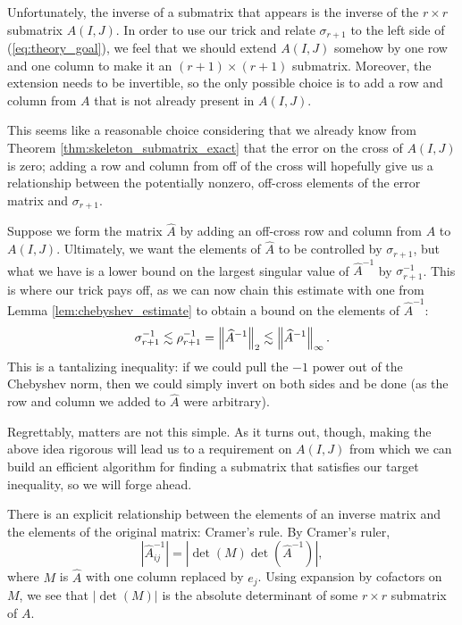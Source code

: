 \documentclass{article}
\begin{document}
	Unfortunately, the inverse of a submatrix that appears is the inverse of the $r\times r$ submatrix $A(I,J)$. In order to use our trick and relate $\sigma_{r+1}$ to the left side of (\ref{eq:theory_goal}), we feel that we should extend $A(I,J)$ somehow by one row and one column to make it an $(r+1)\times(r+1)$ submatrix. Moreover, the extension needs to be invertible, so the only possible choice is to add a row and column from $A$ that is not already present in $A(I,J)$.
	
	This seems like a reasonable choice considering that we already know from Theorem \ref{thm:skeleton_submatrix_exact} that the error on the cross of $A(I,J)$ is zero; adding a row and column from off of the cross will hopefully give us a relationship between the potentially nonzero, off-cross elements of the error matrix and $\sigma_{r+1}$.
	
	Suppose we form the matrix $\widehat{A}$ by adding an off-cross row and column from $A$ to $A(I,J)$. Ultimately, we want the elements of $\widehat{A}$ to be controlled by $\sigma_{r+1}$, but what we have is a lower bound on the largest singular value of $\widehat{A}^{-1}$ by $\sigma_{r+1}^{-1}$. This is where our trick pays off, as we can now chain this estimate with one from Lemma \ref{lem:chebyshev_estimate} to obtain a bound on the elements of $\widehat{A}^{-1}$:
	\begin{equation}
		\label{eq:almost_there}
		\sigma_{r+1}^{-1} \lesssim \rho_{r+1}^{-1} = \left\lVert \widehat{A}^{-1} \right\rVert_2 \lesssim \left\lVert \widehat{A}^{-1} \right\rVert_\infty.
	\end{equation}
	This is a tantalizing inequality: if we could pull the $-1$ power out of the Chebyshev norm, then we could simply invert on both sides and be done (as the row and column we added to $\widehat{A}$ were arbitrary).
	
	Regrettably, matters are not this simple. As it turns out, though, making the above idea rigorous will lead us to a requirement on $A(I,J)$ from which we can build an efficient algorithm for finding a submatrix that satisfies our target inequality, so we will forge ahead.
	
	There is an explicit relationship between the elements of an inverse matrix and the elements of the original matrix: Cramer's rule. By Cramer's ruler,
	\begin{equation}
		\left|\widehat{A}^{-1}_{ij}\right| = \left|\det(M)\det\left(\widehat{A}^{-1}\right)\right|,
	\end{equation}
	where $M$ is $\widehat{A}$ with one column replaced by $e_j$. Using expansion by cofactors on $M$, we see that $|\det(M)|$ is the absolute determinant of some $r\times r$ submatrix of $A$.
	
\end{document}
